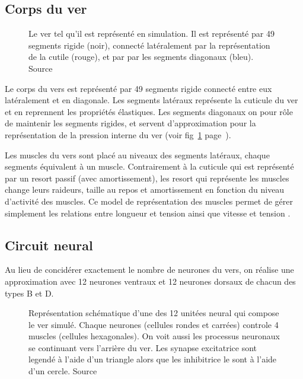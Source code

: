 \subsection{Corps du ver} %
\label{sub:Corps du ver}

\begin{figure}[ht]
   \begin{center}
   \end{center}
   \caption{Le ver tel qu'il est représenté en simulation. Il est représenté
   par 49 segments rigide (noir), connecté latéralement par la représentation
   de la cutile (rouge), et par par les segments diagonaux (bleu). Source
   \cite{Boyle2009}}
   \label{fig:celegans_representation}
\end{figure}

Le corps du vers est représenté par 49 segments rigide connecté entre eux
latéralement et en diagonale. Les segments latéraux représente la cuticule du
ver et en reprennent les propriétés élastiques. Les segments diagonaux on pour
rôle de maintenir les segments rigides, et servent d'approximation pour la
représentation de la pression interne du ver (voir
fig~\ref{fig:celegans_representation}
page~\pageref{fig:celegans_representation}).

Les muscles du vers sont placé au niveaux des segments latéraux, chaque segments
équivalent à un muscle. Contrairement à la cuticule qui est représenté par un
resort passif (avec amortissement), les resort qui représente les muscles
change leurs raideurs, taille au repos et amortissement en fonction du niveau
d'activité des muscles. Ce model de représentation des muscles permet de gérer
simplement les relations entre longueur et tension ainsi que vitesse et tension
\cite{Boyle2009}.


\subsection{Circuit neural} %
\label{sub:Circuit neural}

Au lieu de concidérer exactement le nombre de neurones du vers, on réalise une
approximation avec 12 neurones ventraux et 12 neurones dorsaux de chacun des types
B et D.

\begin{figure}[ht]
   \begin{center}
   \end{center}
   \caption{Représentation schématique d'une des 12 unitées neural qui compose
   le ver simulé. Chaque neurones (cellules rondes et carrées) controle 4
   muscles (cellules hexagonales).  On voit aussi les processus neuronaux se
   continuant vers l'arrière du ver. Les synapse excitatrice sont legendé à
   l'aide d'un triangle alors que les inhibitrice le sont à l'aide d'un cercle.
   Source \cite{Boyle2009}}
   \label{fig:celegans_segment}
\end{figure}

